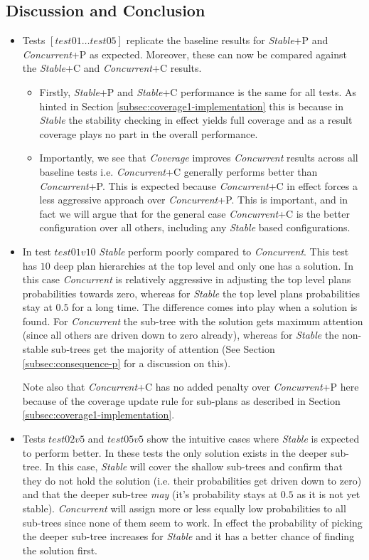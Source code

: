 \documentclass[a4paper]{article}
\newcommand{\cc}{\emph{Concurrent}\xspace}
\newcommand{\st}{\emph{Stable}\xspace}
\newcommand{\cov}{\emph{Coverage}\xspace}
\begin{document}
\subsection{Discussion and Conclusion}
\label{subsec:discussion}
\begin{itemize}

\item Tests $[test01 \ldots test05]$ replicate the baseline results for {\st}+P and {\cc}+P as expected. Moreover, these can now be compared against the {\st}+C and {\cc}+C results.
\begin{itemize}
\item Firstly, {\st}+P and {\st}+C performance is the same for all tests. As hinted in Section \ref{subsec:coverage1-implementation} this is because in \st the stability checking in effect yields full coverage and as a result coverage plays no part in the overall performance.
\item Importantly, we see that \cov improves \cc results across all baseline tests i.e. {\cc}+C generally performs better than {\cc}+P. This is expected because {\cc}+C in effect forces a less aggressive approach over {\cc}+P. This is important, and in fact we will argue that for the general case {\cc}+C is the better configuration over all others, including any \st based configurations.
\end{itemize}

\item In test $test01v10$ \st perform poorly compared to \cc. This test has $10$ deep plan hierarchies at the top level and only one has a solution. In this case \cc is relatively aggressive in adjusting the top level plans probabilities towards zero, whereas for \st the top level plans probabilities stay at $0.5$ for a long time. The difference comes into play when a solution is found. For \cc the sub-tree with the solution gets maximum attention (since all others are driven down to zero already), whereas for \st the non-stable sub-trees get the majority of attention (See Section \ref{subsec:consequence-p} for a discussion on this). 

Note also that {\cc}+C has no added penalty over {\cc}+P here because of the coverage update rule for sub-plans as described in Section \ref{subsec:coverage1-implementation}.

\item Tests $test02v5$ and $test05v5$ show the intuitive cases where \st is expected to perform better. In these tests the only solution exists in the deeper sub-tree. In this case, \st will cover the shallow sub-trees and confirm that they do not hold the solution (i.e. their probabilities get driven down to zero) and that the deeper sub-tree \emph{may} (it's probability stays at $0.5$ as it is not yet stable). \cc will assign more or less equally low probabilities to all sub-trees since none of them seem to work. In effect the probability of picking the deeper sub-tree increases for \st and it has a better chance of finding the solution first. 


\end{itemize}
\end{document}

